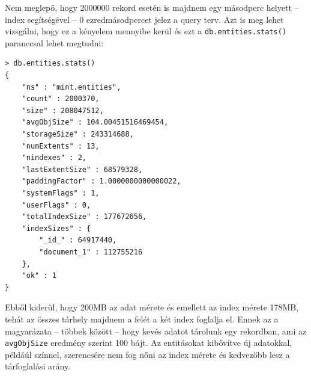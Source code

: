 Nem meglepő, hogy 2000000 rekord esetén is majdnem egy másodperc helyett -- index segítségével -- 0 ezredmásodpercet jelez a query terv. Azt is meg lehet vizsgálni, hogy ez a kényelem mennyibe kerül és ezt a \lstinline{db.entities.stats()} paranccsal lehet megtudni:

\begin{lstlisting}[caption=Kollekció és index nagysága]
> db.entities.stats()
{
    "ns" : "mint.entities",
    "count" : 2000370,
    "size" : 208047512,
    "avgObjSize" : 104.00451516469454,
    "storageSize" : 243314688,
    "numExtents" : 13,
    "nindexes" : 2,
    "lastExtentSize" : 68579328,
    "paddingFactor" : 1.0000000000000022,
    "systemFlags" : 1,
    "userFlags" : 0,
    "totalIndexSize" : 177672656,
    "indexSizes" : {
        "_id_" : 64917440,
        "document_1" : 112755216
    },
    "ok" : 1
} 
\end{lstlisting}

Ebből kiderül, hogy 200MB az adat mérete és emellett az index mérete 178MB, tehát az összes tárhely majdnem a felét a két index foglalja el. Ennek az a magyarázata -- többek között -- hogy kevés adatot tárolunk egy rekordban, ami az \lstinline{avgObjSize} eredmény szerint 100 bájt. Az entitásokat kibővítve új adatokkal, példáúl színnel, szerencsére nem fog nőni az index mérete és kedvezőbb lesz a tárfoglalási arány.


